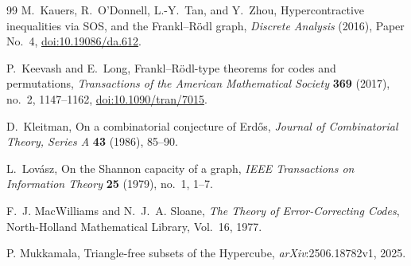 \documentclass[11pt]{article}
\theoremstyle{plain}
\begin{document}
\begin{thebibliography}{99}
M.~Kauers, R.~O'Donnell, L.-Y.~Tan, and Y.~Zhou,
Hypercontractive inequalities via SOS, and the Frankl--R\"odl graph,
\emph{Discrete Analysis} (2016), Paper No.~4,
\href{https://doi.org/10.19086/da.612}{doi:10.19086/da.612}.

P.~Keevash and E.~Long,
Frankl--R\"odl-type theorems for codes and permutations,
\emph{Transactions of the American Mathematical Society}
\textbf{369} (2017), no.~2, 1147--1162,
\href{https://doi.org/10.1090/tran/7015}{doi:10.1090/tran/7015}.

D.~Kleitman,
On a combinatorial conjecture of Erd\H{o}s,
\emph{Journal of Combinatorial Theory, Series A} \textbf{43} (1986), 85--90.

L.~Lov\'asz,
On the Shannon capacity of a graph,
\emph{IEEE Transactions on Information Theory} \textbf{25} (1979), no.~1, 1--7.

F.~J. MacWilliams and N.~J.~A. Sloane,
\emph{The Theory of Error-Correcting Codes},
North-Holland Mathematical Library, Vol.~16, 1977.

P. Mukkamala,
Triangle-free subsets of the Hypercube,
\emph{arXiv}:2506.18782v1, 2025.

\end{thebibliography}
\end{document}
